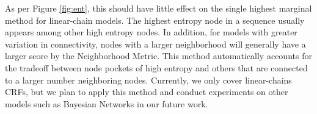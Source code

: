 As per Figure \ref{fig:ent}, this should have little effect on the single highest marginal method for linear-chain models.  The highest entropy node in a sequence usually appears among other high entropy nodes.  In addition, for models with greater variation in connectivity, nodes with a larger neighborhood will generally have a larger score by the Neighborhood Metric.  This method automatically accounts for the tradeoff between node pockets of high entropy and others that are connected to a larger number neighboring nodes.  Currently, we only cover linear-chains CRFs, but we plan to apply this method and conduct experiments on other models such as Bayesian Networks in our future work.
